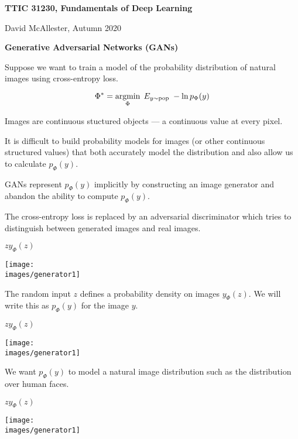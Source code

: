 





{\Huge

  \centerline{\bf TTIC 31230, Fundamentals of Deep Learning}
  \bigskip
  \centerline{David McAllester, Autumn 2020}
  \vfill
  \centerline{\bf Generative Adversarial Networks (GANs)}
\vfill
\vfill



Suppose we want to train a model of the probability distribution of natural images using cross-entropy loss.

\vfill
$$\Phi^* = \operatorname*{argmin}_\Phi \;E_{y \sim \mathrm{pop}}\;-\ln p_\Phi(y)$$

\vfill
Images are continuous stuctured objects --- a continuous value at every pixel.

\vfill
It is difficult to build probability models for images (or other continuous structured values)
that both accurately model the distribution and also allow us to calculate $p_\Phi(y)$.


GANs represent $p_\Phi(y)$ implicitly by constructing an image generator and abandon the ability to compute $p_\Phi(y)$.

\vfill
The cross-entropy loss is replaced by an adversarial discriminator which tries to distinguish between generated images and real images.


\bigskip
\centerline{$z$\hspace{5in}$y_\Phi(z)$}
\centerline{\texttt{[image: \\images/generator1]}}

\bigskip
The random input $z$ defines a probability density on images $y_\Phi(z)$.  We will write this as $p_\Phi(y)$ for the image $y$.


\bigskip
\centerline{$z$\hspace{5in}$y_\Phi(z)$}
\centerline{\texttt{[image: \\images/generator1]}}

\bigskip
We want $p_\Phi(y)$ to model a natural image distribution such as the distribution over human faces.



\bigskip
\centerline{$z$\hspace{5in}$y_\Phi(z)$}
\centerline{\texttt{[image: \\images/generator1]}}

}
